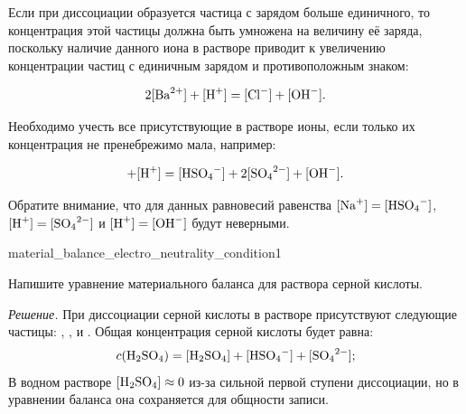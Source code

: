 Если при диссоциации образуется частица с зарядом больше единичного, то концентрация этой частицы должна быть умножена на величину её заряда, поскольку наличие данного иона в растворе приводит к увеличению концентрации частиц с единичным зарядом и противоположным знаком:


\begin{equation*}
    2[\ce{Ba^{2+}}] + [\ce{H^+}] = [\ce{Cl^-}] + [\ce{OH^-}].
\end{equation*}

Необходимо учесть все присутствующие в растворе ионы, если только их концентрация не пренебрежимо мала, например:


\begin{equation*}
    [\ce{Na^+}] + [\ce{H^+}] = [\ce{HSO4^-}] + 2[\ce{SO4^{2-}}] + [\ce{OH^-}].
\end{equation*}

Обратите внимание, что для данных равновесий равенства $[\ce{Na^+}] = [\ce{HSO4^-}]$, $[\ce{H^+}] = [\ce{SO4^{2-}}]$ и $[\ce{H^+}] = [\ce{OH^-}]$ будут неверными.

\begin{example}{}{material_balance_electro_neutrality_condition1}
    \begin{condition}
        Напишите уравнение материального баланса для раствора серной кислоты.
    \end{condition}

    \medskip

    \textit{Решение.} При диссоциации серной кислоты в растворе присутствуют следующие частицы: , ,  и . Общая концентрация серной кислоты будет равна:
    \begin{equation*}
        c(\ce{H2SO4}) = [\ce{H2SO4}] + [\ce{HSO4^-}] + [\ce{SO4^{2-}}];
    \end{equation*}
    В водном растворе $[\ce{H2SO4}] \approx 0$ из-за сильной первой ступени диссоциации, но в уравнении баланса она сохраняется для общности записи.
\end{example}

